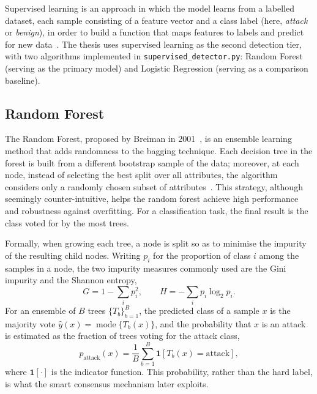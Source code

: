 \documentclass[../main.tex]{subfiles}
\begin{document}
Supervised learning is an approach in which the model learns from a
labelled dataset, each sample consisting of a feature vector and a class
label (here, \emph{attack} or \emph{benign}), in order to build a function
that maps features to labels and predict for new data~\cite{pham2016}. The
thesis uses supervised learning as the second detection tier, with two
algorithms implemented in \texttt{supervised\_detector.py}: Random Forest
(serving as the primary model) and Logistic Regression (serving as a
comparison baseline).

\subsection{Random Forest}

The Random Forest, proposed by Breiman in 2001~\cite{breiman2001}, is an
ensemble learning method that adds randomness to the bagging technique.
Each decision tree in the forest is built from a different bootstrap sample
of the data; moreover, at each node, instead of selecting the best split
over all attributes, the algorithm considers only a randomly chosen subset
of attributes~\cite{pham2016}. This strategy, although seemingly
counter-intuitive, helps the random forest achieve high performance and
robustness against overfitting. For a classification task, the final result
is the class voted for by the most trees.

Formally, when growing each tree, a node is split so as to minimise the
impurity of the resulting child nodes. Writing $p_i$ for the proportion of
class $i$ among the samples in a node, the two impurity measures commonly
used are the Gini impurity and the Shannon entropy,
\begin{equation}
  G = 1 - \sum_{i} p_i^{2},
  \qquad
  H = -\sum_{i} p_i \log_2 p_i .
  \label{eq:gini}
\end{equation}
For an ensemble of $B$ trees $\{T_b\}_{b=1}^{B}$, the predicted class of a
sample $x$ is the majority vote $\hat{y}(x) = \operatorname{mode}\{T_b(x)\}$,
and the probability that $x$ is an attack is estimated as the fraction of
trees voting for the attack class,
\begin{equation}
  p_{\text{attack}}(x) = \frac{1}{B}\sum_{b=1}^{B}
  \mathbf{1}\!\left[T_b(x) = \text{attack}\right],
  \label{eq:rfvote}
\end{equation}
where $\mathbf{1}[\cdot]$ is the indicator function. This probability, rather
than the hard label, is what the smart consensus mechanism later exploits.
\end{document}
